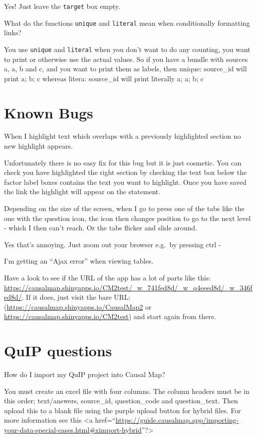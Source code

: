 \documentclass[
]{book}
\begin{document}
Yes! Just leave the \texttt{target} box empty.

What do the functions \texttt{unique} and \texttt{literal} mean when conditionally formatting links?

You use \texttt{unique} and \texttt{literal} when you don't want to do any counting, you want to print or otherwise use the actual values. So if you have a bundle with sources a, a, b and c, and you want to print them as labels, then unique: source\_id will print a; b; c whereas litera: source\_id will print literally a; a; b; c

\hypertarget{known-bugs}{%
\section{Known Bugs}\label{known-bugs}}

When I highlight text which overlaps with a previously highlighted section no new highlight appears.

Unfortunately there is no easy fix for this bug but it is just cosmetic. You can check you have highlighted the right section by checking the text box below the factor label boxes contains the text you want to highlight. Once you have saved the link the highlight will appear on the statement.

Depending on the size of the screen, when I go to press one of the tabs like the one with the question icon, the icon then changes position to go to the next level - which I then can't reach. Or the tabs flicker and slide around.

Yes that's annoying. Just zoom out your browser e.g.~by pressing ctrl -

I'm getting an ``Ajax error'' when viewing tables.

Have a look to see if the URL of the app has a lot of parts like this: \url{https://causalmap.shinyapps.io/CM2test/_w_741fed8d/_w_q4eeed8d/_w_346fed8d/}. If it does, just visit the bare URL: (\url{https://causalmap.shinyapps.io/CausalMap2} or \url{https://causalmap.shinyapps.io/CM2test}) and start again from there.

\hypertarget{quip-questions}{%
\section{QuIP questions}\label{quip-questions}}

How do I import my QuIP project into Causal Map?

You must create an excel file with four columns. The column headers must be in this order; text/answers, source\_id, question\_code and question\_text. Then upload this to a blank file using the purple upload button for hybrid files. For more information see this \textless a href=``\url{https://guide.causalmap.app/importing-your-data-special-cases.html\#ximport-hybrid}''?\textgreater{}
\end{document}
